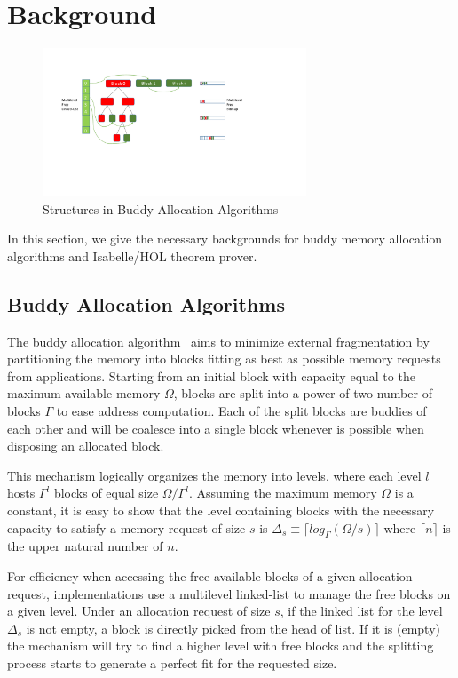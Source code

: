 \section{Background}
\begin{figure}[htbp]
	\centering
	\includegraphics[width=0.7\textwidth]{fig3.pdf}
	\caption{Structures in Buddy Allocation Algorithms}
	\label{fig3}
\end{figure}
In this section, we give the necessary backgrounds for buddy memory allocation algorithms and Isabelle/HOL theorem prover.

\subsection{Buddy Allocation Algorithms}\label{sec:buddy}
The buddy allocation algorithm~\cite{reg_knuth} aims to minimize external fragmentation by partitioning the memory into blocks fitting as best as possible memory requests from applications. Starting from an initial block with capacity equal to the maximum available memory $\Omega$, blocks are split into a power-of-two number of blocks $\Gamma$ to ease address computation. Each of the split blocks are buddies of each other and will be coalesce into a single block whenever is possible when disposing an allocated block. 

This mechanism logically organizes the memory into levels, where each level $l$ hosts $\Gamma^l$ blocks of equal size $\Omega/{\Gamma}^l$. Assuming the maximum memory $\Omega$ is a constant, it is easy to show that the level containing blocks with the necessary capacity to satisfy a memory request of size $s$ is $\Delta_s \equiv \lceil log_\Gamma (\Omega/  s) \rceil$ where $\lceil n \rceil$ is the upper natural number of $n$. 

For efficiency when accessing the free available blocks of a given allocation request, implementations use a multilevel linked-list to manage the free blocks on a given level. Under an allocation request of size $s$, if the linked list for the level $\Delta_s$ is not empty, a block is directly picked from the head of list. If it is (empty) the mechanism will try to find a higher level with free blocks and the splitting process starts to generate a perfect fit for the requested size. 


